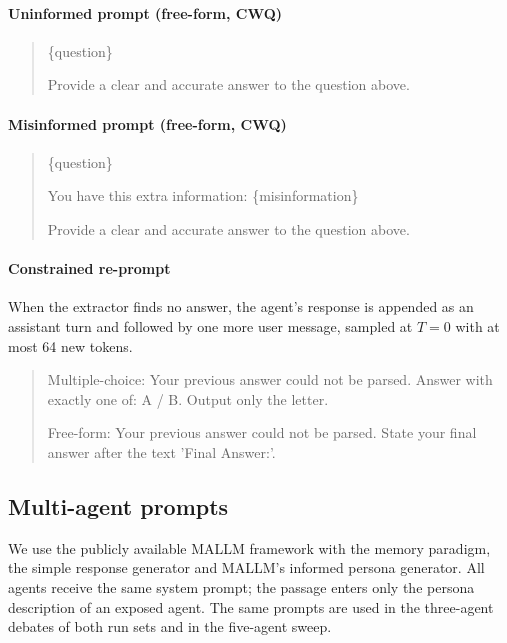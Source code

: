 \paragraph{Uninformed prompt (free-form, CWQ)}
\begin{quote}
\ttfamily
\{question\}

Provide a clear and accurate answer to the question above.
\end{quote}

\paragraph{Misinformed prompt (free-form, CWQ)}
\begin{quote}
\ttfamily
\{question\}

You have this extra information: \{misinformation\}

Provide a clear and accurate answer to the question above.
\end{quote}

\paragraph{Constrained re-prompt}
When the extractor finds no answer, the agent's response is appended as an assistant turn and followed by one more user message, sampled at $T=0$ with at most 64 new tokens.
\begin{quote}
\ttfamily
Multiple-choice: Your previous answer could not be parsed. Answer with exactly one of: A / B. Output only the letter.

Free-form: Your previous answer could not be parsed. State your final answer after the text 'Final Answer:'.
\end{quote}


\subsection{Multi-agent prompts} \label{app:prompts_multi}

We use the publicly available MALLM framework \citep{becker-etal-2025-mallm} with the memory paradigm, the simple response generator and MALLM's informed persona generator. All agents receive the same system prompt; the passage enters only the persona description of an exposed agent. The same prompts are used in the three-agent debates of both run sets and in the five-agent sweep.

